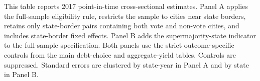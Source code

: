 \newpage
\begin{table}[H]\centering
\caption{\textbf{Point-in-Time Robustness: Border-City and Supermajority Specifications}}
\label{tab:point_in_time_robustness}
\parbox{\textwidth}{This table reports 2017 point-in-time cross-sectional estimates. Panel A applies the full-sample eligibility rule, restricts the sample to cities near state borders, retains only state-border pairs containing both vote and non-vote cities, and includes state-border fixed effects. Panel B adds the supermajority-state indicator to the full-sample specification. Both panels use the strict outcome-specific controls from the main debt-choice and aggregate-yield tables. Controls are suppressed. Standard errors are clustered by state-year in Panel A and by state in Panel B.}
\end{table}

\vspace{10pt}

